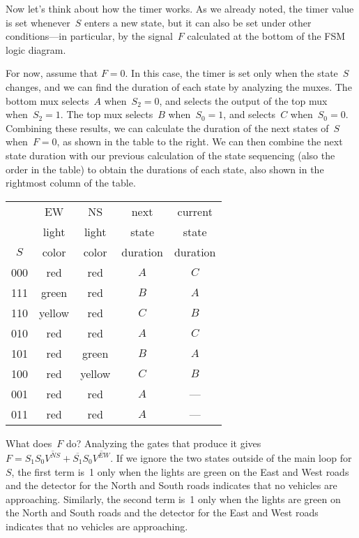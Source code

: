 Now let's think about how the timer works.  As we already noted, the
timer value is set whenever~$S$ enters a new state, but it can also be
set under other conditions---in particular, by the signal~$F$ calculated
at the bottom of the FSM logic diagram.  

\begin{minipage}{3.4in}
For now, assume that $F=0$.  In this case, the timer is set only when
the state~$S$ changes, and we can find the duration of each state by
analyzing the muxes.  The bottom mux selects~$A$ when~$S_2=0$, and 
selects the output of the top mux when~$S_2=1$.  The top mux selects~$B$
when~$S_0=1$, and selects~$C$ when~$S_0=0$.  Combining these results,
we can calculate the duration of the next states of~$S$ when~$F=0$, 
as shown in the table to the right.  We can then combine the next
state duration with our previous calculation of the state sequencing 
(also the order in the table) to obtain the durations of each state, also
shown in the rightmost column of the table.
\end{minipage}\hspace{0.25in}%
\begin{minipage}{2.85in}
\begin{tabular}{c|cc|cc}
& EW& NS& next& current\\
& light& light& state& state\\
$S$& color& color& duration& duration\\ \hline
000&    red&    red& $A$& $C$\\
111&  green&    red& $B$& $A$\\
110& yellow&    red& $C$& $B$\\
010&    red&    red& $A$& $C$\\
101&    red&  green& $B$& $A$\\
100&    red& yellow& $C$& $B$\\ \hline
001&    red&    red& $A$& ---\\
011&    red&    red& $A$& ---\\
\end{tabular}\vspace{12pt}
\end{minipage}

What does~$F$ do?  Analyzing the gates that produce it gives 
$F=S_1S_0\overline{V^{NS}}+\overline{S_1}S_0\overline{V^{EW}}$.  If we 
ignore the two states outside of the main loop for~$S$, the first term 
is~1 only when the lights are green on the East and West roads and the 
detector for the North and South roads indicates that no vehicles are 
approaching.  Similarly, the second term is~1 only when the lights are 
green on the North and South roads and the detector for the East and 
West roads indicates that no vehicles are approaching.

